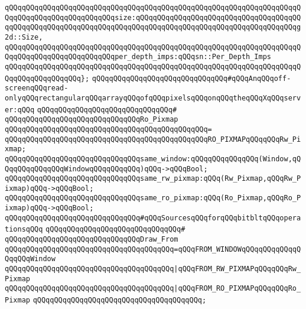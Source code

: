 \verb|qQQqqQQqqQQqqQQqqQQqqQQqqQQqqQQqqQQqqQQqqQQqqQQqqQQqqQQqqQQqqQQqqQQqqQQqqQQqqQQqqQQqqQQqqQQqqQQqsize:qQQqqQQqqQQqqQQqqQQqqQQqqQQqqQQqqQQqqQQqqQQqqQQqqQQqqQQqqQQqqQQqqQQqqQQqqQQqqQQqqQQqqQQqqQQqqQQqqQQqqQQqqQQqg2d::Size,|\newline
\verb|qQQqqQQqqQQqqQQqqQQqqQQqqQQqqQQqqQQqqQQqqQQqqQQqqQQqqQQqqQQqqQQqqQQqqQQqqQQqqQQqqQQqqQQqqQQqqQQqper_depth_imps:qQQqsn::Per_Depth_Imps|\newline
\verb|qQQqqQQqqQQqqQQqqQQqqQQqqQQqqQQqqQQqqQQqqQQqqQQqqQQqqQQqqQQqqQQqqQQqqQQqqQQqqQQqqQQqqQQq};|\newline
\newline
\verb|qQQqqQQqqQQqqQQqqQQqqQQqqQQqqQQq#qQQqAnqQQqoff-screenqQQqread-onlyqQQqrectangularqQQqarrayqQQqofqQQqpixelsqQQqonqQQqtheqQQqXqQQqserver:qQQq|\newline
\verb|qQQqqQQqqQQqqQQqqQQqqQQqqQQqqQQq#|\newline
\verb|qQQqqQQqqQQqqQQqqQQqqQQqqQQqqQQqRo_Pixmap|\newline
\verb|qQQqqQQqqQQqqQQqqQQqqQQqqQQqqQQqqQQqqQQqqQQqqQQq=|\newline
\verb|qQQqqQQqqQQqqQQqqQQqqQQqqQQqqQQqqQQqqQQqqQQqqQQqRO_PIXMAPqQQqqQQqRw_Pixmap;|\newline
\newline
\verb|qQQqqQQqqQQqqQQqqQQqqQQqqQQqqQQqsame_window:qQQqqQQqqQQqqQQq(Window,qQQqqQQqqQQqqQQqWindowqQQqqQQqqQQq)qQQq->qQQqBool;|\newline
\verb|qQQqqQQqqQQqqQQqqQQqqQQqqQQqqQQqsame_rw_pixmap:qQQq(Rw_Pixmap,qQQqRw_Pixmap)qQQq->qQQqBool;|\newline
\verb|qQQqqQQqqQQqqQQqqQQqqQQqqQQqqQQqsame_ro_pixmap:qQQq(Ro_Pixmap,qQQqRo_Pixmap)qQQq->qQQqBool;|\newline
\newline
\verb|qQQqqQQqqQQqqQQqqQQqqQQqqQQqqQQq#qQQqSourcesqQQqforqQQqbitbltqQQqoperationsqQQq|\newline
\verb|qQQqqQQqqQQqqQQqqQQqqQQqqQQqqQQq#|\newline
\verb|qQQqqQQqqQQqqQQqqQQqqQQqqQQqqQQqDraw_From|\newline
\verb|qQQqqQQqqQQqqQQqqQQqqQQqqQQqqQQqqQQqqQQq=qQQqFROM_WINDOWqQQqqQQqqQQqqQQqqQQqWindow|\newline
\verb|qQQqqQQqqQQqqQQqqQQqqQQqqQQqqQQqqQQqqQQq|\verb#|qQQqFROM_RW_PIXMAPqQQqqQQqRw_Pixmap#\newline
\verb|qQQqqQQqqQQqqQQqqQQqqQQqqQQqqQQqqQQqqQQq|\verb#|qQQqFROM_RO_PIXMAPqQQqqQQqRo_Pixmap#\newline
\verb|qQQqqQQqqQQqqQQqqQQqqQQqqQQqqQQqqQQqqQQq;|\newline
